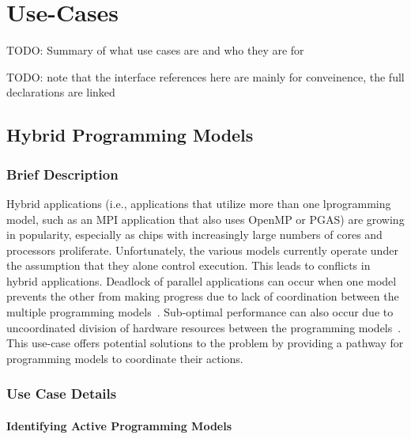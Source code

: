 \chapter{Use-Cases}
\label{chap:use-cases}

TODO: Summary of what use cases are and who they are for

TODO: note that the interface references here are mainly for conveinence, the
full declarations are linked

\section{Hybrid Programming Models}
\label{chap:hybrid_programming_models}


\subsection{Brief Description}
Hybrid applications (i.e., applications that utilize more than one lprogramming model, such as an MPI application that also uses OpenMP or PGAS) are growing in popularity, especially as chips with increasingly large numbers of cores and processors proliferate. Unfortunately, the various models currently operate under the assumption that they alone control execution. This leads to conflicts in hybrid applications. Deadlock of parallel applications can occur when one model prevents the other from making progress due to lack of coordination between the multiple programming models~\cite{2016:Hamidouche}.  Sub-optimal performance can also occur due to uncoordinated division of hardware resources between the programming models~\cite{2018:Vallee,ompix-moc}. This use-case offers potential solutions to the problem by providing a pathway for programming models to coordinate their actions.

\subsection{Use Case Details}

\subsubsection{Identifying Active Programming Models}

